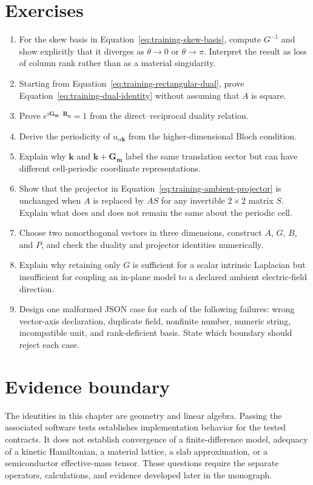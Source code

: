 \section{Exercises}

\begin{enumerate}
  \item For the skew basis in Equation~\eqref{eq:training-skew-basis}, compute
        $G^{-1}$ and show explicitly that it diverges as
        $\theta\rightarrow0$ or $\theta\rightarrow\pi$. Interpret the result as
        loss of column rank rather than as a material singularity.
  \item Starting from Equation~\eqref{eq:training-rectangular-dual}, prove
        Equation~\eqref{eq:training-dual-identity} without assuming that $A$ is
        square.
  \item Prove
        $e^{i\mathbf G_{\mathbf m}\cdot\mathbf R_{\mathbf n}}=1$ from the
        direct--reciprocal duality relation.
  \item Derive the periodicity of $u_{\alpha\mathbf k}$ from the
        higher-dimensional Bloch condition.
  \item Explain why $\mathbf k$ and
        $\mathbf k+\mathbf G_{\mathbf m}$ label the same translation sector but
        can have different cell-periodic coordinate representations.
  \item Show that the projector in
        Equation~\eqref{eq:training-ambient-projector} is unchanged when $A$ is
        replaced by $AS$ for any invertible $2\times2$ matrix $S$. Explain what
        does and does not remain the same about the periodic cell.
  \item Choose two nonorthogonal vectors in three dimensions, construct $A$,
        $G$, $B$, and $P$, and check the duality and projector identities
        numerically.
  \item Explain why retaining only $G$ is sufficient for a scalar intrinsic
        Laplacian but insufficient for coupling an in-plane model to a declared
        ambient electric-field direction.
  \item Design one malformed JSON case for each of the following failures:
        wrong vector-axis declaration, duplicate field, nonfinite number,
        numeric string, incompatible unit, and rank-deficient basis. State
        which boundary should reject each case.
\end{enumerate}

\section{Evidence boundary}

The identities in this chapter are geometry and linear algebra. Passing the
associated software tests establishes implementation behavior for the tested
contracts. It does not establish convergence of a finite-difference model,
adequacy of a kinetic Hamiltonian, a material lattice, a slab approximation,
or a semiconductor effective-mass tensor. Those questions require the
separate operators, calculations, and evidence developed later in the
monograph.
